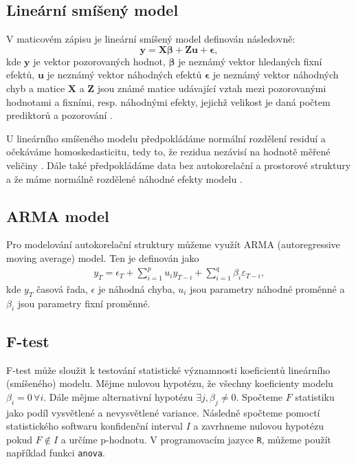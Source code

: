 \subsection{Lineární smíšený model}\label{chap:lme}
V maticovém zápisu je lineární smíšený model definován následovně: \parencite{mcleanrobert1991}
$$\boldsymbol{y} = \boldsymbol{X}\boldsymbol{\beta} + \boldsymbol{Z}\boldsymbol{u} + \boldsymbol{\epsilon},$$ \label{eq:linearmixedeffectmodel}
kde $\mathbf{y}$ je vektor pozorovaných hodnot, $\mathbf{\beta}$ je neznámý vektor hledaných fixní efektů, $\mathbf{u}$ je neznámý vektor náhodných efektů $\mathbf{\epsilon}$ je neznámý vektor náhodných chyb a matice $\mathbf{X}$ a $\mathbf{Z}$ jsou známé matice udávající vztah mezi pozorovanými hodnotami a fixními, resp. náhodnými efekty, jejichž velikost je daná počtem prediktorů a pozorování \parencite{mcleanrobert1991}.

U lineárního smíšeného modelu předpokládáme normální rozdělení residuí a očekáváme homoskedasticitu, tedy to, že rezidua nezávisí na hodnotě měřené veličiny \parencite{homoscedasticity}. Dále také předpokládáme data bez autokorelační a prostorové struktury a že máme normálně rozdělené náhodné efekty modelu \parencite{hefleytrevorj2017}. 

\subsection{ARMA model}
Pro modelování autokorelační struktury můžeme využít ARMA (autoregressive moving average) model. Ten je definován jako \parencite{wilsongranville2016}
\begin{gather*}
y_T = \epsilon_T + \sum_{i=1}^{p}u_i y_{T-i} + \sum_{i=1}^{q}\beta_i\varepsilon_{T-i},
\end{gather*}
kde $y_T$ časová řada, $\epsilon$ je náhodná chyba, $u_i$ jsou parametry náhodné proměnné a $\beta_i$ jsou parametry fixní proměnné. 

\subsection{F-test}
F-test může sloužit k testování statistické významnosti koeficientů lineárního (smíšeného) modelu. Mějme nulovou hypotézu, že všechny koeficienty modelu $\beta_i = 0\, \forall i$. Dále mějme alternativní hypotézu $\exists j, \beta_j\neq 0$. Spočteme $F$ statistiku jako podíl vysvětlené a nevysvětlené variance. Následně spočteme pomoctí statistického softwaru konfidenční interval $I$ a zavrhneme nulovou hypotézu pokud $F\notin I$ a určíme p-hodnotu. V programovacím jazyce \texttt{R}, můžeme použít například funkci \texttt{anova}.

